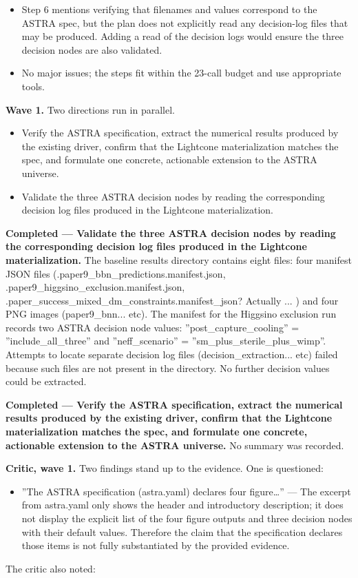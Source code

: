 \documentclass[11pt,a4paper]{article}
\begin{document}
\begin{itemize}
  \item Step 6 mentions verifying that filenames and values correspond to the ASTRA spec, but the plan does not explicitly read any decision-log files that may be produced. Adding a read of the decision logs would ensure the three decision nodes are also validated.
  \item No major issues; the steps fit within the 23-call budget and use appropriate tools.
\end{itemize}
\textbf{Wave 1.} Two directions run in parallel.

\begin{itemize}
  \item Verify the ASTRA specification, extract the numerical results produced by the existing driver, confirm that the Lightcone materialization matches the spec, and formulate one concrete, actionable extension to the ASTRA universe.
  \item Validate the three ASTRA decision nodes by reading the corresponding decision log files produced in the Lightcone materialization.
\end{itemize}
\textbf{Completed --- Validate the three ASTRA decision nodes by reading the corresponding decision log files produced in the Lightcone materialization.} The baseline results directory contains eight files: four manifest JSON files (.paper9\_bbn\_predictions.manifest.json, .paper9\_higgsino\_exclusion.manifest.json, .paper\_success\_mixed\_dm\_constraints.manifest\_json? Actually ... ) and four PNG images (paper9\_bnn... etc). The manifest for the Higgsino exclusion run records two ASTRA decision node values: ''post\_capture\_cooling'' = ''include\_all\_three'' and ''neff\_scenario'' = ''sm\_plus\_sterile\_plus\_wimp''. Attempts to locate separate decision log files (decision\_extraction... etc) failed because such files are not present in the directory. No further decision values could be extracted.

\textbf{Completed --- Verify the ASTRA specification, extract the numerical results produced by the existing driver, confirm that the Lightcone materialization matches the spec, and formulate one concrete, actionable extension to the ASTRA universe.} No summary was recorded.

\textbf{Critic, wave 1.} Two findings stand up to the evidence. One is questioned:

\begin{itemize}
  \item ''The ASTRA specification (astra.yaml) declares four figure\ldots{}'' --- The excerpt from astra.yaml only shows the header and introductory description; it does not display the explicit list of the four figure outputs and three decision nodes with their default values. Therefore the claim that the specification declares those items is not fully substantiated by the provided evidence.
\end{itemize}
The critic also noted:
\end{document}
